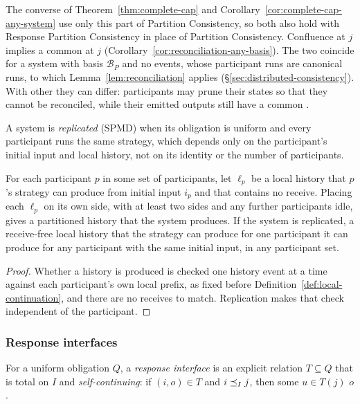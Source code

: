 The converse of Theorem~\ref{thm:complete-cap} and
Corollary~\ref{cor:complete-cap-any-system} use only this part of Partition
Consistency, so both also hold with Response Partition Consistency in place of
Partition Consistency.  Confluence at $j$ implies a common \outnoun at $j$
(Corollary~\ref{cor:reconciliation-any-basis}).  The two coincide for a system
with basis $\mathcal B_P$ and no \commitment events, whose participant runs
are canonical runs, to which Lemma~\ref{lem:reconciliation} applies
(\S\ref{sec:distributed-consistency}).  With other \commitments they can
differ: participants may prune their states so that they cannot be
reconciled, while their emitted outputs still have a common \outnoun.

A system is \emph{replicated} (SPMD) when its obligation is uniform and every
participant runs the same strategy, which depends only on the participant's
initial input and local history, not on its identity or the number of
participants.

\begin{lemma}[Locality]
\label{lem:locality}
For each participant $p$ in some set of participants, let $\ell_p$ be a local
history that $p$'s
strategy can produce from initial input $i_p$ and that contains no receive.
Placing each $\ell_p$ on its own side, with at least two sides and
any further participants
idle, gives a partitioned history that the system produces.  If the system is
replicated, a receive-free local history that the strategy can produce for one participant
it can produce for any participant with the same initial input, in any
participant set.
\end{lemma}

\begin{proof}
Whether a history is produced is checked one history event at a time against each
participant's own local prefix, as fixed before
Definition~\ref{def:local-continuation},
and there are no receives to match.
Replication makes that check independent of the participant.
\end{proof}

\subsubsection{Response interfaces}

\begin{definition}
\label{def:response-interface}
For a uniform obligation $Q$, a \emph{response interface} is an explicit
relation $T\subseteq Q$ that is total on $I$ and \emph{self-continuing}: if
$(i,o)\in T$ and $i\preceq_I j$, then some $u\in T(j)$ \outrel $o$.
\end{definition}

